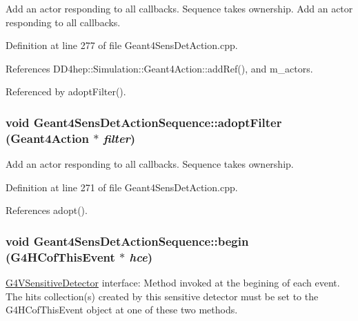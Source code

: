 Add an actor responding to all callbacks. Sequence takes ownership. Add an actor responding to all callbacks. 

Definition at line 277 of file Geant4SensDetAction.cpp.

References DD4hep::Simulation::Geant4Action::addRef(), and m\_\-actors.

Referenced by adoptFilter().\hypertarget{class_d_d4hep_1_1_simulation_1_1_geant4_sens_det_action_sequence_ae387c8632412ef9eec6ed9767d3ea01b}{
\subsubsection[{adoptFilter}]{\setlength{\rightskip}{0pt plus 5cm}void Geant4SensDetActionSequence::adoptFilter ({\bf Geant4Action} $\ast$ {\em filter})}}
\label{class_d_d4hep_1_1_simulation_1_1_geant4_sens_det_action_sequence_ae387c8632412ef9eec6ed9767d3ea01b}


Add an actor responding to all callbacks. Sequence takes ownership. 

Definition at line 271 of file Geant4SensDetAction.cpp.

References adopt().\hypertarget{class_d_d4hep_1_1_simulation_1_1_geant4_sens_det_action_sequence_a59c1e52c811f9385da294c0b18704ab1}{
\subsubsection[{begin}]{\setlength{\rightskip}{0pt plus 5cm}void Geant4SensDetActionSequence::begin (G4HCofThisEvent $\ast$ {\em hce})}}
\label{class_d_d4hep_1_1_simulation_1_1_geant4_sens_det_action_sequence_a59c1e52c811f9385da294c0b18704ab1}


\hyperlink{class_g4_v_sensitive_detector}{G4VSensitiveDetector} interface: Method invoked at the begining of each event. The hits collection(s) created by this sensitive detector must be set to the G4HCofThisEvent object at one of these two methods.

